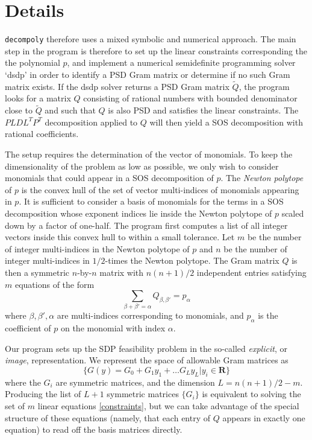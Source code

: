 \documentclass[oneside, 10pt]{amsart}
\begin{document}
    \section{Details}
    \texttt{decompoly} therefore uses a mixed symbolic and numerical approach. The main step in the program is therefore to set up the linear constraints corresponding the the polynomial $p$, and implement a numerical semidefinite programming solver `dsdp' in order to identify a PSD Gram matrix or determine if no such Gram matrix exists. If the dsdp solver returns a PSD Gram matrix $\tilde{Q}$, the program looks for a matrix $Q$ consisting of rational numbers with bounded denominator close to $\tilde{Q}$ and such that $Q$ is also PSD and satisfies the linear constraints. The $PLDL^T P^T$ decomposition applied to $Q$ will then yield a SOS decomposition with rational coefficients.

    The setup requires the determination of the vector of monomials. To keep the dimensionality of the problem as low as possible, we only wish to consider monomials that could appear in a SOS decomposition of $p$. The \emph{Newton polytope} of $p$ is the convex hull of the set of vector multi-indices of monomials appearing in $p$. It is sufficient to consider a basis of monomials for the terms in a SOS decomposition whose exponent indices lie inside the Newton polytope of $p$ scaled down by a factor of one-half. The program first computes a list of all integer vectors inside this convex hull to within a small tolerance. Let $m$ be the number of integer multi-indices in the Newton polytope of $p$ and $n$ be the number of integer multi-indices in $1/2$-times the Newton polytope. The Gram matrix $Q$ is then a symmetric $n$-by-$n$ matrix with $n(n+1)/2$ independent entries satisfying $m$ equations of the form
    \begin{equation}
        \label{constraints}
        \sum_{\beta + \beta' = \alpha} Q_{\beta,\beta'} = p_\alpha
    \end{equation}
    where $\beta,\beta',\alpha$ are multi-indices corresponding to monomials, and $p_\alpha$ is the coefficient of $p$ on the monomial with index $\alpha$.

    Our program sets up the SDP feasibility problem in the so-called \emph{explicit}, or \emph{image}, representation. We represent the space of allowable Gram matrices as
    \begin{equation}
        \{G(y) = G_0 + G_1 y_1 + \dots G_L y_L | y_i \in \mathbf{R}\}
    \end{equation}
    where the $G_i$ are symmetric matrices, and the dimension $L = n(n+1)/2 - m$. Producing the list of $L+1$ symmetric matrices $\{G_i\}$ is equivalent to solving the set of $m$ linear equations \eqref{constraints}, but we can take advantage of the special structure of these equations (namely, that each entry of $Q$ appears in exactly one equation) to read off the basis matrices directly.
\end{document}
